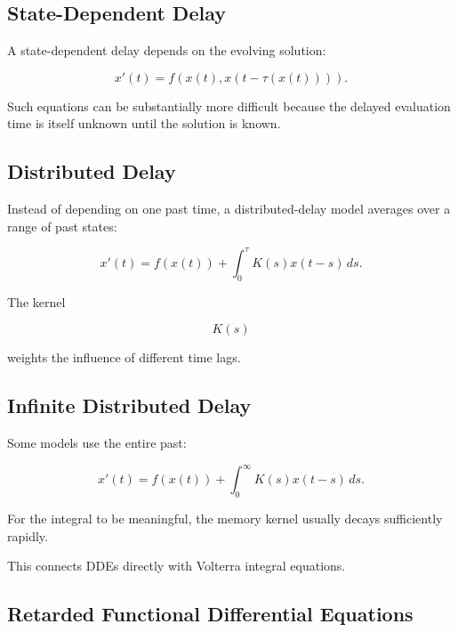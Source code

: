 \subsection{State-Dependent Delay}
\label{subsec:state-dependent-delay}

A state-dependent delay depends on the evolving solution:

\[
\boxed{
x'(t)
=
f
\left(
x(t),
x
\left(
t-\tau(x(t))
\right)
\right).
}
\]

Such equations can be substantially more difficult because the delayed
evaluation time is itself unknown until the solution is known.

\subsection{Distributed Delay}
\label{subsec:distributed-delay}

Instead of depending on one past time, a distributed-delay model averages
over a range of past states:

\[
\boxed{
x'(t)
=
f(x(t))
+
\int_0^\tau
K(s)x(t-s)\,ds.
}
\]

The kernel

\[
K(s)
\]

weights the influence of different time lags.

\subsection{Infinite Distributed Delay}
\label{subsec:infinite-distributed-delay}

Some models use the entire past:

\[
\boxed{
x'(t)
=
f(x(t))
+
\int_0^\infty
K(s)x(t-s)\,ds.
}
\]

For the integral to be meaningful, the memory kernel usually decays
sufficiently rapidly.

This connects DDEs directly with Volterra integral equations.

\subsection{Retarded Functional Differential Equations}
\label{subsec:retarded-functional-differential-equations}

